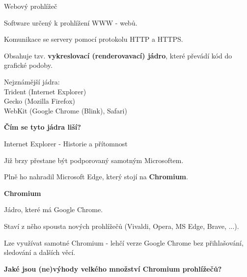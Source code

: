 \documentclass[aspectratio=1610]{beamer}
\begin{document}
\begin{frame}{Webový prohlížeč}
    \begin{cardTiny}
        \begin{flushleft}
            Software určený k prohlížení WWW - webů.

            Komunikace se servery pomocí protokolu HTTP a HTTPS.

            Obsahuje tzv. \textbf{vykreslovací (renderovavací) jádro}, které převádí kód do grafické podoby.

            \vspace{2ex}

            Nejznámější jádra:\\Trident (Internet Explorer)\\Gecko (Mozilla Firefox)\\WebKit (Google Chrome (Blink), Safari)
        \end{flushleft}
    \end{cardTiny}
    \begin{cardTiny}
        \begin{center}
            \textbf{Čím se tyto jádra liší?}
        \end{center}
    \end{cardTiny}
\end{frame}

\begin{frame}{Internet Explorer - Historie a přítomnost}
    \begin{cardTiny}
        \begin{flushleft}
            Již brzy přestane být podporovaný samotným Microsoftem.

            Plně ho nahradil Microsoft Edge, který stojí na \textbf{Chromium}.
        \end{flushleft}
    \end{cardTiny}
    \begin{cardTiny}
        \begin{flushleft}
            \textbf{Chromium}

            Jádro, které má Google Chrome.

            Staví z něho spousta nových prohlížečů (Vivaldi, Opera, MS Edge, Brave, ...).

            Lze využívat samotné Chromium - lehčí verze Google Chrome bez přihlašování, sledování a dalších věcí.     
        \end{flushleft}
    \end{cardTiny}
    \begin{cardTiny}
        \begin{center}
            \textbf{Jaké jsou (ne)výhody velkého množství Chromium prohlížečů?}
        \end{center}
    \end{cardTiny}
\end{frame}
\end{document}
